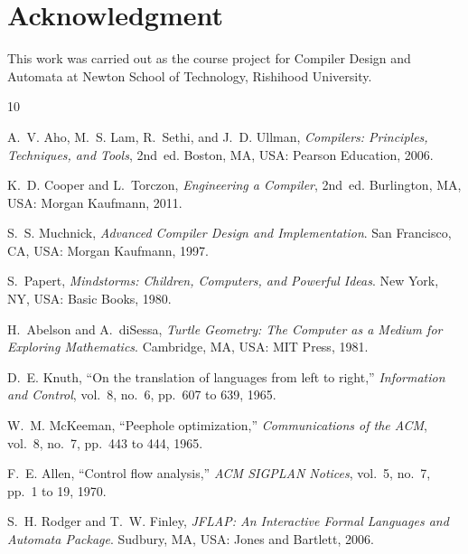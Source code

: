\documentclass[conference]{IEEEtran}
\begin{document}
\section*{Acknowledgment}

This work was carried out as the course project for Compiler Design and Automata at Newton School of Technology, Rishihood University.

\begin{thebibliography}{10}

A.~V. Aho, M.~S. Lam, R.~Sethi, and J.~D. Ullman, \emph{Compilers: Principles, Techniques, and Tools}, 2nd~ed. Boston, MA, USA: Pearson Education, 2006.

K.~D. Cooper and L.~Torczon, \emph{Engineering a Compiler}, 2nd~ed. Burlington, MA, USA: Morgan Kaufmann, 2011.

S.~S. Muchnick, \emph{Advanced Compiler Design and Implementation}. San Francisco, CA, USA: Morgan Kaufmann, 1997.

S.~Papert, \emph{Mindstorms: Children, Computers, and Powerful Ideas}. New York, NY, USA: Basic Books, 1980.

H.~Abelson and A.~diSessa, \emph{Turtle Geometry: The Computer as a Medium for Exploring Mathematics}. Cambridge, MA, USA: MIT Press, 1981.

D.~E. Knuth, ``On the translation of languages from left to right,'' \emph{Information and Control}, vol.~8, no.~6, pp.~607 to 639, 1965.

W.~M. McKeeman, ``Peephole optimization,'' \emph{Communications of the ACM}, vol.~8, no.~7, pp.~443 to 444, 1965.

F.~E. Allen, ``Control flow analysis,'' \emph{ACM SIGPLAN Notices}, vol.~5, no.~7, pp.~1 to 19, 1970.

S.~H. Rodger and T.~W. Finley, \emph{JFLAP: An Interactive Formal Languages and Automata Package}. Sudbury, MA, USA: Jones and Bartlett, 2006.

\end{thebibliography}
\end{document}
